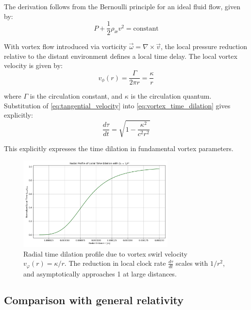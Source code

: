 The derivation follows from the Bernoulli principle for an ideal fluid flow, given by:
\begin{equation}\label{eq:Bernoulli}
P + \frac{1}{2}\rho_\text{\ae} v^2 = \text{constant}
\end{equation}

With vortex flow introduced via vorticity $\vec{\omega} = \nabla \times \vec{v}$, the local pressure reduction relative to the distant environment defines a local time delay. The local vortex velocity is given by:
\begin{equation}\label{eq:tangential_velocity}
v_{\phi}(r) = \frac{\Gamma}{2\pi r} = \frac{\kappa}{r}
\end{equation}

where $\Gamma$ is the circulation constant, and $\kappa$ is the circulation quantum. Substitution of \eqref{eq:tangential_velocity} into \eqref{eq:vortex_time_dilation} gives explicitly:
\begin{equation}\label{eq:vortex_time_explicit}
\frac{d\tau}{dt} = \sqrt{1 - \frac{\kappa^2}{c^2 r^2}}
\end{equation}

This explicitly expresses the time dilation in fundamental vortex parameters.

\begin{figure}[H]
  \centering
  \includegraphics[width=0.7\textwidth]{02-RadialProfileOfLocalTimeDilation_Radial_LocalTime_Dilation}
  \caption{Radial time dilation profile due to vortex swirl velocity \( v_\varphi(r) = \kappa / r \). The reduction in local clock rate \(\frac{d\tau}{dt}\) scales with \(1/r^2\), and asymptotically approaches 1 at large distances.}
  \label{fig:radial_time_dilation}
\end{figure}

\subsection{Comparison with general relativity}

